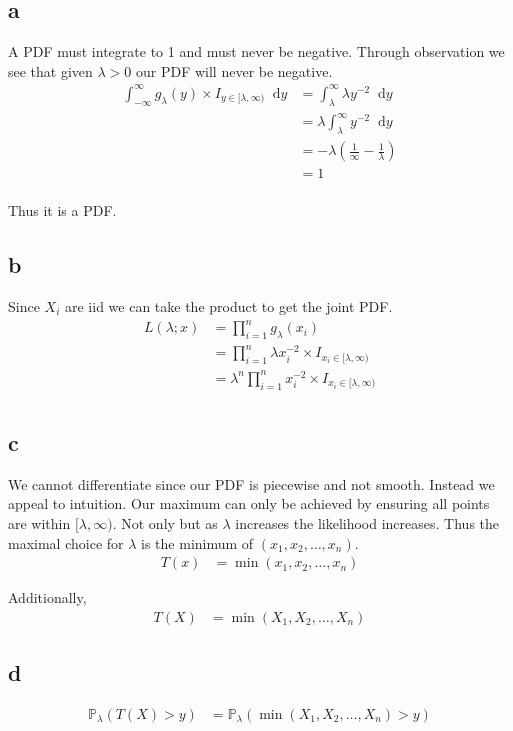 \documentclass{article}
\newcommand{\diff}{\mathop{}\!\mathrm{d}}
\newcommand{\prob}{\mathbb{P}}
\begin{document}
\subsection{a}
A PDF must integrate to 1 and must never be negative.
Through observation we see that given $\lambda > 0$ our PDF will never be
negative.
\begin{align*}
    \int_{-\infty}^\infty g_\lambda(y)
    \times I_{y \in [\lambda, \infty)} \diff y
    &= \int_\lambda^\infty \lambda y^{-2} \diff y \\
    &= \lambda \int_\lambda^\infty y^{-2} \diff y \\
    &= -\lambda \left(\frac{1}{\infty} - \frac{1}{\lambda}\right) \\
    &= 1 \\
\end{align*}

Thus it is a PDF\@.

\subsection{b}
Since $X_i$ are iid we can take the product to get the joint PDF\@.
\begin{align*}
    L(\lambda;x) &= \prod_{i=1}^n g_\lambda (x_i) \\
    &= \prod_{i=1}^n \lambda x_i^{-2} \times I_{x_i \in [\lambda, \infty)} \\
    &= \lambda^n \prod_{i=1}^n x_i^{-2} \times I_{x_i \in [\lambda, \infty)} \\
\end{align*}

\subsection{c}
We cannot differentiate since our PDF is piecewise and not smooth.
Instead we appeal to intuition. Our maximum can only be achieved by ensuring all
points are within $[\lambda, \infty)$. Not only but as $\lambda$ increases the
likelihood increases. Thus the maximal choice for $\lambda$ is the minimum of
$(x_1, x_2, \ldots, x_n)$. 
\begin{align*}
    T(x) &= \min (x_1, x_2, \ldots, x_n)
\end{align*}

Additionally,
\begin{align*}
    T(X) &= \min (X_1, X_2, \ldots, X_n)
\end{align*}

\subsection{d}
\begin{align*}
    \prob_\lambda (T(X) > y) &= \prob_\lambda (\min (X_1, X_2, \ldots, X_n) > y) \\
\end{align*}
\end{document}
